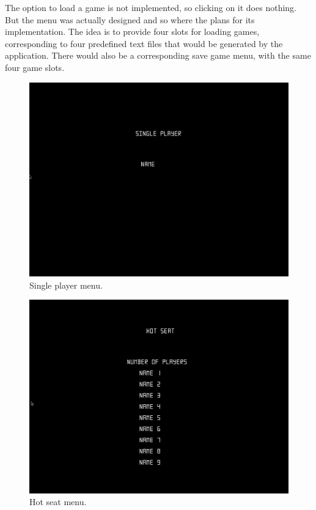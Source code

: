 \documentclass[11pt,a4paper,reqno]{report}
\numberwithin{equation}{section}
\begin{document}
The option to load a game is not implemented, so clicking on it does nothing. But the menu was actually designed and so where the plans for its implementation. The idea is to provide four slots for loading games, corresponding to four predefined text files that would be generated by the application. There would also be a corresponding save game menu, with the same four game slots.

\begin{figure}[htbp]
\begin{center}
\includegraphics[scale=0.3]{menu_single.png}
\caption{Single player menu.}
\label{menu_single}
\end{center}
\end{figure}

\begin{figure}[htbp]
\begin{center}
\includegraphics[scale=0.3]{menu_hot.png}
\caption{Hot seat menu.}
\label{menu_hot}
\end{center}
\end{figure}
\end{document}

